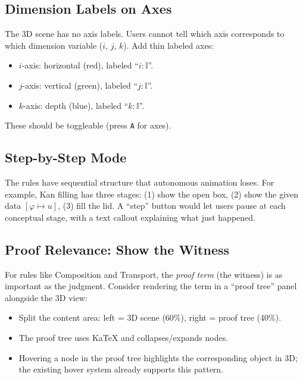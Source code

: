 \documentclass[11pt, a4paper]{article}
\begin{document}
\subsection{Dimension Labels on Axes}

The 3D scene has no axis labels. Users cannot tell which axis corresponds to which
dimension variable ($i$, $j$, $k$). Add thin labeled axes:
\begin{itemize}
  \item $i$-axis: horizontal (red), labeled ``$i : \mathbb{I}$''.
  \item $j$-axis: vertical (green), labeled ``$j : \mathbb{I}$''.
  \item $k$-axis: depth (blue), labeled ``$k : \mathbb{I}$''.
\end{itemize}
These should be toggleable (press \texttt{A} for axes).

\subsection{Step-by-Step Mode}

The rules have sequential structure that autonomous animation loses.
For example, Kan filling has three stages: (1) show the open box, (2) show the
given data $[\varphi \mapsto u]$, (3) fill the lid. A ``step'' button would let
users pause at each conceptual stage, with a text callout explaining what just
happened.

\subsection{Proof Relevance: Show the Witness}

For rules like Composition and Transport, the \emph{proof term} (the witness) is as
important as the judgment. Consider rendering the term in a ``proof tree'' panel
alongside the 3D view:

\begin{itemize}
  \item Split the content area: left = 3D scene (60\%), right = proof tree (40\%).
  \item The proof tree uses KaTeX and collapses/expands nodes.
  \item Hovering a node in the proof tree highlights the corresponding object in
    3D; the existing hover system already supports this pattern.
\end{itemize}

\end{document}
